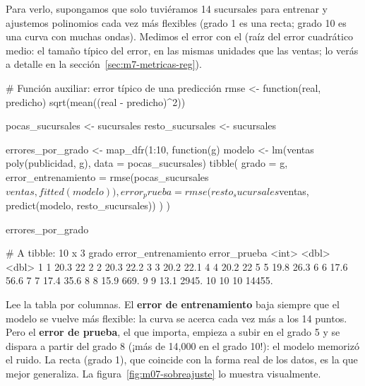 Para verlo, supongamos que solo tuviéramos 14 sucursales para entrenar y
ajustemos polinomios cada vez más flexibles (grado 1 es una recta; grado 10 es
una curva con muchas ondas). Medimos el error con el  (raíz del
error cuadrático medio: el tamaño típico del error, en las mismas unidades que
las ventas; lo verás a detalle en la sección~\ref{sec:m7-metricas-reg}).

\begin{rcode}
# Función auxiliar: error típico de una predicción
rmse <- function(real, predicho) sqrt(mean((real - predicho)^2))

pocas_sucursales <- sucursales %
resto_sucursales <- sucursales %

errores_por_grado <- map_dfr(1:10, function(g) {
  modelo <- lm(ventas ~ poly(publicidad, g), data = pocas_sucursales)
  tibble(
    grado = g,
    error_entrenamiento = rmse(pocas_sucursales$ventas, fitted(modelo)),
    error_prueba = rmse(resto_sucursales$ventas,
                        predict(modelo, resto_sucursales))
  )
})

errores_por_grado %
\end{rcode}

\begin{rsalida}
# A tibble: 10 x 3
   grado error_entrenamiento error_prueba
   <int>               <dbl>        <dbl>
 1     1                20.3         22  
 2     2                20.3         22.2
 3     3                20.2         22.1
 4     4                20.2         22  
 5     5                19.8         26.3
 6     6                17.6         56.6
 7     7                17.4         35.6
 8     8                15.9        669. 
 9     9                13.1       2945. 
10    10                10        14455. 
\end{rsalida}

Lee la tabla por columnas. El \textbf{error de entrenamiento} baja siempre que
el modelo se vuelve más flexible: la curva se acerca cada vez más a los 14
puntos. Pero el \textbf{error de prueba}, el que importa, empieza a subir en el
grado 5 y se dispara a partir del grado 8 (¡más de 14{,}000 en el grado 10!):
el modelo memorizó el ruido. La recta (grado 1), que coincide con
la forma real de los datos, es la que mejor generaliza. La
figura~\ref{fig:m07-sobreajuste} lo muestra visualmente.

